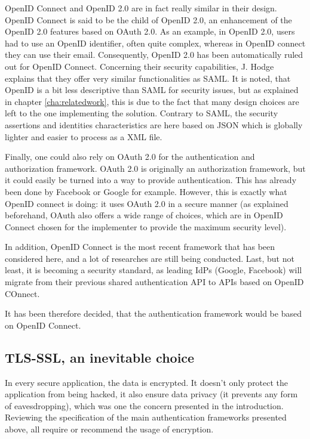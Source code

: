 OpenID Connect and OpenID 2.0 are in fact really similar in their design. OpenID Connect is said to be the child of OpenID 2.0, an enhancement of the OpenID 2.0 features based on OAuth 2.0. As an example, in OpenID 2.0, users had to use an OpenID identifier, often quite complex, whereas in OpenID connect they can use their email. Consequently, OpenID 2.0 has been automatically ruled out for OpenID Connect. Concerning their security capabilities, J. Hodge explains that they offer very similar functionalities as SAML\cite{Hodge2008}. It is noted, that OpenID is a bit less descriptive than SAML for security issues, but as explained in chapter \ref{cha:relatedwork}, this is due to the fact that many design choices are left to the one implementing the solution. Contrary to SAML, the security assertions and identities characteristics are here based on JSON which is globally lighter and easier to process as a XML file.

Finally, one could also rely on OAuth 2.0 for the authentication and authorization framework. OAuth 2.0 is originally an authorization framework, but it could easily be turned into a way to provide authentication. This has already been done by Facebook or Google for example. However, this is exactly what OpenID connect is doing: it uses OAuth 2.0 in a secure manner (as explained beforehand, OAuth also offers a wide range of choices, which are in OpenID Connect chosen for the implementer to provide the maximum security level).

In addition, OpenID Connect is the most recent framework that has been considered here, and a lot of researches are still being conducted. Last, but not least, it is becoming a security standard, as leading IdPs (Google, Facebook) will migrate from their previous shared authentication API to APIs based on OpenID COnnect.

It has been therefore decided, that the authentication framework would be based on OpenID Connect.

\subsection{TLS-SSL, an inevitable choice}
In every secure application, the data is encrypted. It doesn't only protect the application from being hacked, it also ensure data privacy (it prevents any form of eavesdropping), which was one the concern presented in the introduction. Reviewing the specification of the main authentication frameworks presented above, all require or recommend the usage of encryption.


